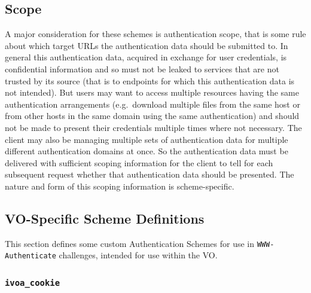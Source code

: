 \documentclass[11pt,a4paper]{ivoa}
\newcommand{\header}[1]{{\tt #1}}
\begin{document}


\subsection{Scope}\label{sec:scope}

A major consideration for these schemes is authentication scope,
that is some rule about which target URLs the authentication data
should be submitted to.
In general this authentication data,
acquired in exchange for user credentials,
is confidential information and so must not be leaked to services
that are not trusted by its source
(that is to endpoints for which this authentication data is
not intended).
But users may want to access multiple resources
having the same authentication arrangements
(e.g.\ download multiple files from the same host or from
other hosts in the same domain using the same authentication)
and should not be made to present their credentials
multiple times where not necessary.
The client may also be managing multiple sets of authentication data
for multiple different authentication domains at once.
So the authentication data must be delivered with sufficient scoping
information for the client to tell for each subsequent request
whether that authentication data should be presented.
The nature and form of this scoping information is scheme-specific.



\subsection{VO-Specific Scheme Definitions}\label{sec:voschemes}

This section defines some custom Authentication Schemes
for use in \header{WWW-Authenticate} challenges,
intended for use within the VO.

\subsubsection{\mbox{\tt ivoa\_cookie}}\label{sec:ivoa-cookie}
\end{document}
